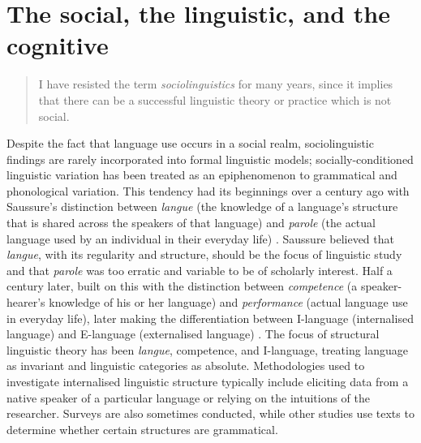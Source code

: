 						
\section{The social, the linguistic, and the cognitive}

\begin{quote}
	I have resisted the term \textit{sociolinguistics} for many years, since it implies that there can be a successful linguistic theory or practice which is not social. \cite[xix]{labov1972sociolingpatterns}
\end{quote}

\noindent Despite the fact that language use occurs in a social realm, sociolinguistic findings are rarely incorporated into formal linguistic models; socially-conditioned linguistic variation has been treated as an epiphenomenon to grammatical and phonological variation.  This tendency had its beginnings over a century ago with Saussure's distinction between \textit{langue} (the knowledge of a language's structure that is shared across the speakers of that language) and \textit{parole} (the actual language used by an individual in their everyday life) \cite{saussure1916}.  Saussure believed that \textit{langue}, with its regularity and structure, should be the focus of linguistic study and that \textit{parole} was too erratic and variable to be of scholarly interest.  Half a century later,  built on this with the distinction between  \textit{competence} (a speaker-hearer's knowledge of his or her language) and \textit{performance} (actual language use in everyday life), later making the differentiation between I-language (internalised language) and E-language (externalised language) \cite[20-22]{chomsky1986}.  The focus of structural linguistic theory has been \textit{langue}, competence, and I-language, treating language as invariant and linguistic categories as absolute.  Methodologies used to investigate internalised linguistic structure typically include eliciting data from a native speaker of a particular language or relying on the intuitions of the researcher.  Surveys are also sometimes conducted, while other studies use texts to determine whether certain structures are grammatical.  

